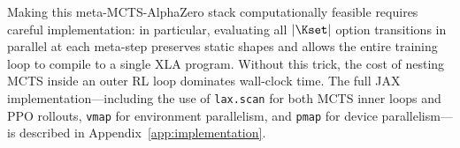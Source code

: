 Making this meta-MCTS-AlphaZero stack computationally feasible requires
careful implementation: in particular, evaluating all $|\Kset|$ option
transitions in parallel at each meta-step preserves static shapes and
allows the entire training loop to compile to a single XLA program.
Without this trick, the cost of nesting MCTS inside an outer RL loop
dominates wall-clock time.
The full JAX implementation---including the use of \texttt{lax.scan}
for both MCTS inner loops and PPO rollouts, \texttt{vmap} for
environment parallelism, and \texttt{pmap} for device parallelism---is
described in Appendix~\ref{app:implementation}.
